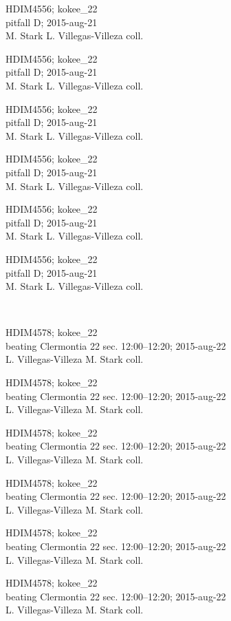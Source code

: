 \documentclass[2pt]{extarticle}
\begin{document}
\noindent
\parbox{0.16\textwidth}{\tiny \raggedright \rule[-0.3\baselineskip]{0pt}{10pt}HDIM4556; kokee\_22\\ pitfall D; 2015-aug-21\\ M. Stark L. Villegas-Villeza coll.}
\parbox{0.16\textwidth}{\tiny \raggedright \rule[-0.3\baselineskip]{0pt}{10pt}HDIM4556; kokee\_22\\ pitfall D; 2015-aug-21\\ M. Stark L. Villegas-Villeza coll.}
\parbox{0.16\textwidth}{\tiny \raggedright \rule[-0.3\baselineskip]{0pt}{10pt}HDIM4556; kokee\_22\\ pitfall D; 2015-aug-21\\ M. Stark L. Villegas-Villeza coll.}
\parbox{0.16\textwidth}{\tiny \raggedright \rule[-0.3\baselineskip]{0pt}{10pt}HDIM4556; kokee\_22\\ pitfall D; 2015-aug-21\\ M. Stark L. Villegas-Villeza coll.}
\parbox{0.16\textwidth}{\tiny \raggedright \rule[-0.3\baselineskip]{0pt}{10pt}HDIM4556; kokee\_22\\ pitfall D; 2015-aug-21\\ M. Stark L. Villegas-Villeza coll.}
\parbox{0.16\textwidth}{\tiny \raggedright \rule[-0.3\baselineskip]{0pt}{10pt}HDIM4556; kokee\_22\\ pitfall D; 2015-aug-21\\ M. Stark L. Villegas-Villeza coll.} \\ 
\vspace{0.001in} 

\noindent
\parbox{0.16\textwidth}{\tiny \raggedright \rule[-0.3\baselineskip]{0pt}{10pt}HDIM4578; kokee\_22\\ beating Clermontia 22 sec. 12:00--12:20; 2015-aug-22\\ L. Villegas-Villeza M. Stark coll.}
\parbox{0.16\textwidth}{\tiny \raggedright \rule[-0.3\baselineskip]{0pt}{10pt}HDIM4578; kokee\_22\\ beating Clermontia 22 sec. 12:00--12:20; 2015-aug-22\\ L. Villegas-Villeza M. Stark coll.}
\parbox{0.16\textwidth}{\tiny \raggedright \rule[-0.3\baselineskip]{0pt}{10pt}HDIM4578; kokee\_22\\ beating Clermontia 22 sec. 12:00--12:20; 2015-aug-22\\ L. Villegas-Villeza M. Stark coll.}
\parbox{0.16\textwidth}{\tiny \raggedright \rule[-0.3\baselineskip]{0pt}{10pt}HDIM4578; kokee\_22\\ beating Clermontia 22 sec. 12:00--12:20; 2015-aug-22\\ L. Villegas-Villeza M. Stark coll.}
\parbox{0.16\textwidth}{\tiny \raggedright \rule[-0.3\baselineskip]{0pt}{10pt}HDIM4578; kokee\_22\\ beating Clermontia 22 sec. 12:00--12:20; 2015-aug-22\\ L. Villegas-Villeza M. Stark coll.}
\parbox{0.16\textwidth}{\tiny \raggedright \rule[-0.3\baselineskip]{0pt}{10pt}HDIM4578; kokee\_22\\ beating Clermontia 22 sec. 12:00--12:20; 2015-aug-22\\ L. Villegas-Villeza M. Stark coll.} \\ 
\vspace{0.001in} 
\end{document}

